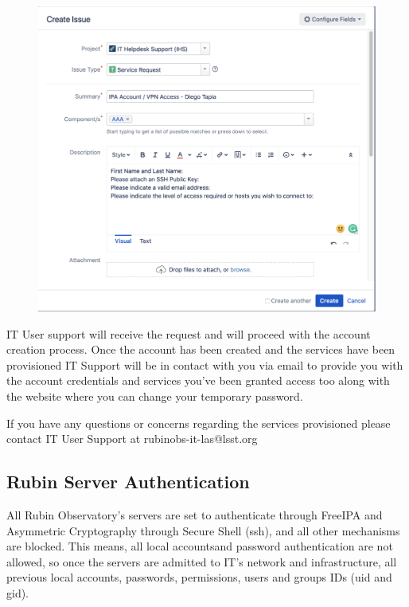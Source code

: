 \begin{figure}
  \includegraphics[width=13cm]{Images/example3.png}
\end{figure}

\vspace{10 mm}
IT User support will receive the request and will proceed with the account creation process. Once the account has been created and the services have been provisioned IT Support will be in contact with you via email to provide you with the account credentials and services you've been granted access too along with the website where you can change your temporary password.

If you have any questions or concerns regarding the services provisioned please contact IT User Support at rubinobs-it-las@lsst.org

\subsection{Rubin Server Authentication}
\label{sec:SSH}

All  Rubin  Observatory’s  servers  are  set  to  authenticate  through  FreeIPA  and  Asymmetric Cryptography through  Secure  Shell  (ssh),  and all other  mechanisms  are  blocked.  This  means,  all  local accountsand password authentication are not allowed, so once the servers are admitted to IT’s network and infrastructure, all previous local accounts, passwords, permissions, users and groups IDs (uid and gid).

